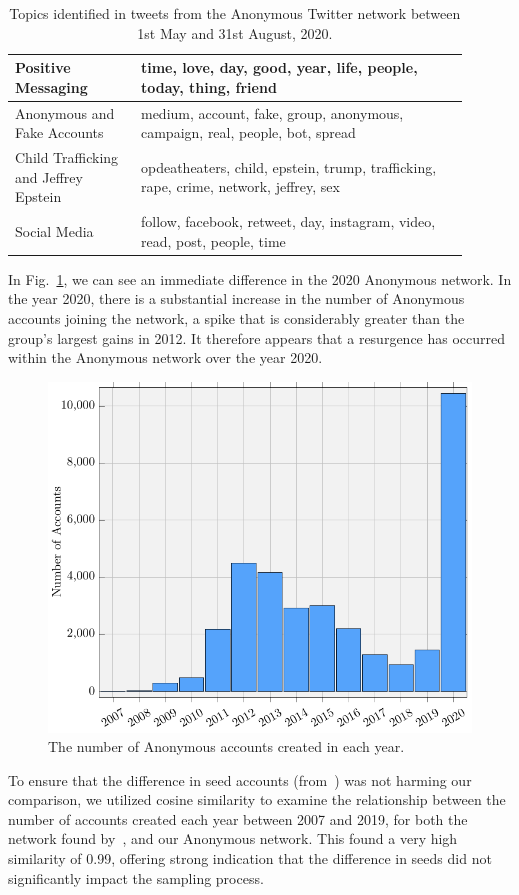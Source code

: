 \documentclass[letterpaper]{article}
\begin{document}
\begin{table}[!ht]
\begin{tabular}{p{0.25\linewidth} >{\raggedright\arraybackslash}p{0.65\linewidth}}
  \midrule
Positive Messaging & time, love, day, good, year, life, people, today, thing, friend \\
  \midrule
Anonymous and Fake Accounts & medium, account, fake, group, anonymous, campaign, real, people, bot, spread \\
  \midrule
Child Trafficking and Jeffrey Epstein & opdeatheaters, child, epstein, trump, trafficking, rape, crime, network, jeffrey, sex \\
  \midrule
Social Media & follow, facebook, retweet, day, instagram, video, read, post, people, time \\
 \bottomrule
\end{tabular}
\caption{Topics identified in tweets from the Anonymous Twitter network between 1st May and 31st August, 2020.}
\label{table:AnonTopics}
\end{table}

In Fig.~\ref{fig:createDate}, we can see an immediate difference in the 2020 Anonymous network. In the year 2020, there is a substantial increase in the number of Anonymous accounts joining the network, a spike that is considerably greater than the group's largest gains in 2012. It therefore appears that a resurgence has occurred within the Anonymous network over the year 2020.

\begin{figure}[!ht]
\centering
\includegraphics[width=0.6\linewidth]{accounts_created.pdf}
\caption{The number of Anonymous accounts created in each year.}
\label{fig:createDate}
\end{figure}

To ensure that the difference in seed accounts (from~\cite{Jones2020}) was not harming our comparison, we utilized cosine similarity to examine the relationship between the number of accounts created each year between 2007 and 2019, for both the network found by~\citeauthor{Jones2020}, and our Anonymous network. This found a very high similarity of 0.99, offering strong indication that the difference in seeds did not significantly impact the sampling process.
\end{document}
